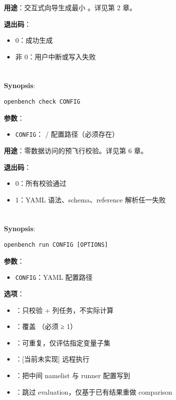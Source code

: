 \textbf{用途}：交互式向导生成最小 。详见第 2 章。

\textbf{退出码}：

\begin{itemize}
  \item 0：成功生成
  \item 非 0：用户中断或写入失败
\end{itemize}

\section{}

\textbf{Synopsis}:

\begin{verbatim}
openbench check CONFIG
\end{verbatim}

\textbf{参数}：

\begin{itemize}
  \item \texttt{CONFIG}： /  配置路径（必须存在）
\end{itemize}

\textbf{用途}：零数据访问的预飞行校验。详见第 6 章。

\textbf{退出码}：

\begin{itemize}
  \item 0：所有校验通过
  \item 1：YAML 语法、schema、reference 解析任一失败
\end{itemize}

\section{}

\textbf{Synopsis}:

\begin{verbatim}
openbench run CONFIG [OPTIONS]
\end{verbatim}

\textbf{参数}：

\begin{itemize}
  \item \texttt{CONFIG}：YAML 配置路径
\end{itemize}

\textbf{选项}：

\begin{itemize}
  \item {}：只校验 + 列任务，不实际计算
  \item {}：覆盖 （必须 ≥ 1）
  \item {}：可重复，仅评估指定变量子集
  \item {}：[当前未实现] 远程执行
  \item {}：把中间 namelist 与 runner 配置写到 
  \item {}：跳过 evaluation，仅基于已有结果重做 comparison
\end{itemize}

